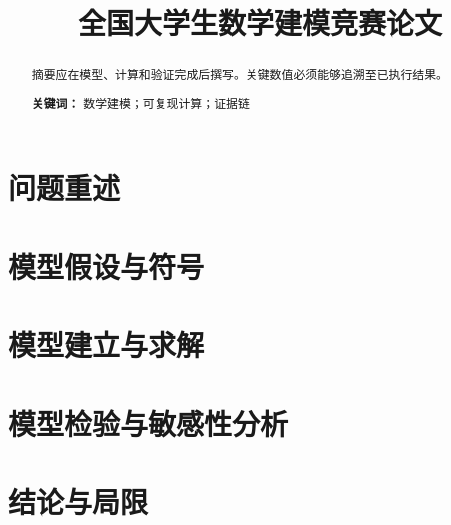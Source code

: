 \documentclass[12pt,a4paper]{ctexart}
\title{全国大学生数学建模竞赛论文}
\author{}
\date{}
\begin{document}
\maketitle

\begin{abstract}
摘要应在模型、计算和验证完成后撰写。关键数值必须能够追溯至已执行结果。

\textbf{关键词：} 数学建模；可复现计算；证据链
\end{abstract}

\section{问题重述}
\section{模型假设与符号}
\section{模型建立与求解}
\section{模型检验与敏感性分析}
\section{结论与局限}
\end{document}
